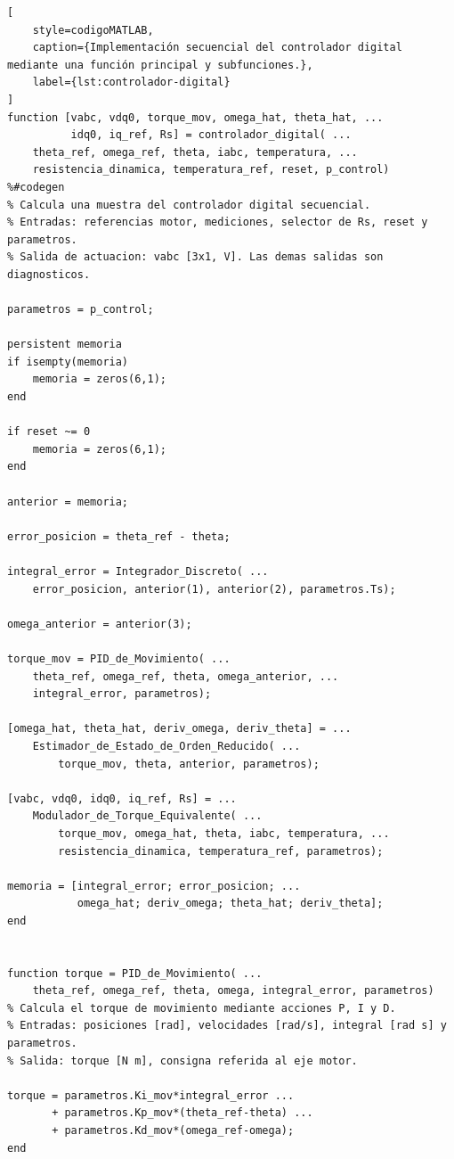 \documentclass[blue,fullpaper]{ludusofficial}  %
\begin{document}
\begin{lstlisting}[
    style=codigoMATLAB,
    caption={Implementación secuencial del controlador digital mediante una función principal y subfunciones.},
    label={lst:controlador-digital}
]
function [vabc, vdq0, torque_mov, omega_hat, theta_hat, ...
          idq0, iq_ref, Rs] = controlador_digital( ...
    theta_ref, omega_ref, theta, iabc, temperatura, ...
    resistencia_dinamica, temperatura_ref, reset, p_control)
%#codegen
% Calcula una muestra del controlador digital secuencial.
% Entradas: referencias motor, mediciones, selector de Rs, reset y parametros.
% Salida de actuacion: vabc [3x1, V]. Las demas salidas son diagnosticos.

parametros = p_control;

persistent memoria
if isempty(memoria)
    memoria = zeros(6,1);
end

if reset ~= 0
    memoria = zeros(6,1);
end

anterior = memoria;

error_posicion = theta_ref - theta;

integral_error = Integrador_Discreto( ...
    error_posicion, anterior(1), anterior(2), parametros.Ts);

omega_anterior = anterior(3);

torque_mov = PID_de_Movimiento( ...
    theta_ref, omega_ref, theta, omega_anterior, ...
    integral_error, parametros);

[omega_hat, theta_hat, deriv_omega, deriv_theta] = ...
    Estimador_de_Estado_de_Orden_Reducido( ...
        torque_mov, theta, anterior, parametros);

[vabc, vdq0, idq0, iq_ref, Rs] = ...
    Modulador_de_Torque_Equivalente( ...
        torque_mov, omega_hat, theta, iabc, temperatura, ...
        resistencia_dinamica, temperatura_ref, parametros);

memoria = [integral_error; error_posicion; ...
           omega_hat; deriv_omega; theta_hat; deriv_theta];
end


function torque = PID_de_Movimiento( ...
    theta_ref, omega_ref, theta, omega, integral_error, parametros)
% Calcula el torque de movimiento mediante acciones P, I y D.
% Entradas: posiciones [rad], velocidades [rad/s], integral [rad s] y parametros.
% Salida: torque [N m], consigna referida al eje motor.

torque = parametros.Ki_mov*integral_error ...
       + parametros.Kp_mov*(theta_ref-theta) ...
       + parametros.Kd_mov*(omega_ref-omega);
end



\end{lstlisting}
\end{document}
